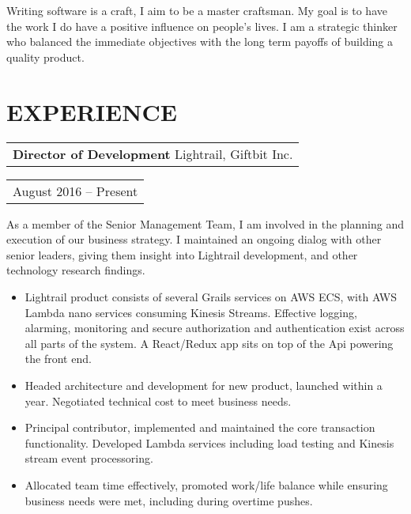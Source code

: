 \documentclass{resume}
\begin{document}

\address{\href{http://grahambaradoy.com}{grahambaradoy.com} \\ \href{https://www.github.com/baradoy}{github.com/baradoy}}
\address{ \href{mailto:graham@baradoy.com}{graham@baradoy.com} \\ 250-216-7112 }

\begin{resume}

\section{}
    Writing software is a craft, I aim to be a master craftsman.
    My goal is to have the work I do have a positive influence on people's lives.
    I am a strategic thinker who balanced the immediate objectives with the long term payoffs of building a quality product.

\section{EXPERIENCE}
    \vspace{+0.1in}
    \begin{tabular}[t]{@{}l}
        {\bf Director of Development} Lightrail, Giftbit Inc.
    \end{tabular}\vspace{+0.05in}
    \hfill
    \begin{tabular}[t]{l@{}}
        August 2016 -- Present
    \end{tabular}
    As a member of the Senior Management Team, I am involved in the planning and execution of our business strategy.
    I maintained an ongoing dialog with other senior leaders, giving them insight into Lightrail development, and other technology research findings.
    \vspace{+0.05in}
    \begin{itemize} \itemsep -2pt
    \item Lightrail product consists of several Grails services on AWS ECS, with AWS Lambda nano services consuming Kinesis Streams. Effective logging, alarming, monitoring and secure authorization and authentication exist across all parts of the system. A React/Redux app sits on top of the Api powering the front end.
    \item Headed architecture and development for new product, launched within a year. Negotiated technical cost to meet business needs.
    \item Principal contributor, implemented and maintained the core transaction functionality. Developed Lambda services including load testing and Kinesis stream event processoring.
    \item Allocated team time effectively, promoted work/life balance while ensuring business needs were met, including during overtime pushes.
    \end{itemize}


\end{resume}
\end{document}
